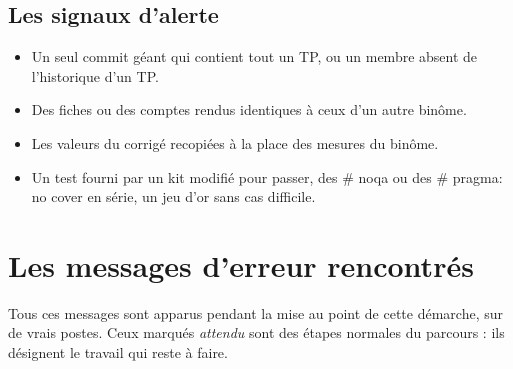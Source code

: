 \documentclass[11pt,a4paper]{article}
\newcommand{\co}[1]{{\ttfamily\hyphenchar\font=45\relax #1}}
\begin{document}
\subsection{Les signaux d'alerte}

\begin{itemize}
\item Un seul commit géant qui contient tout un TP, ou un membre absent de l'historique d'un TP.
\item Des fiches ou des comptes rendus identiques à ceux d'un autre binôme.
\item Les valeurs du corrigé recopiées à la place des mesures du binôme.
\item Un test fourni par un kit modifié pour passer, des \co{\# noqa} ou des \co{\# pragma: no cover} en
série, un jeu d'or sans cas difficile.
\end{itemize}

\section{Les messages d'erreur rencontrés}

Tous ces messages sont apparus pendant la mise au point de cette démarche, sur de vrais postes. Ceux marqués
\emph{attendu} sont des étapes normales du parcours : ils désignent le travail qui reste à faire.
\end{document}
